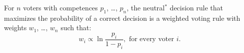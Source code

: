 \documentclass[preview, border={0pt 5pt 3pt 1pt}, varwidth=14.5cm]{standalone} %
\begin{document}
















For \(n\) voters with competences \(p_1\), \dots, \(p_n\), 
the neutral\(^*\) decision rule that maximizes the probability of a correct decision is
a weighted voting rule with weights \(w_1\), \dots, \(w_n\) such that:
\[
    w_i \propto \ln{\frac{p_i}{1-p_i}}, \text{ for every voter } i.
\]



\end{document}
